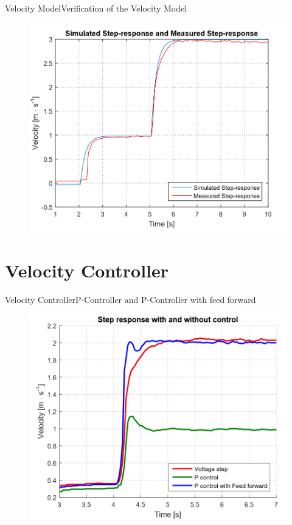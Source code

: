 \begin{frame}{Velocity Model}{Verification of the Velocity Model}

\begin{figure}[H]
	\centering
	\includegraphics[scale=0.39]{Pictures/amaliehererden.png}   
\end{figure}

\end{frame}

\section{Velocity Controller}

\begin{frame}{Velocity Controller}{P-Controller and P-Controller with feed forward}

\begin{figure}[H]
	\centering
	\includegraphics[scale=0.39]{Pictures/stepWithPControl2.png}   
\end{figure}

\end{frame}

